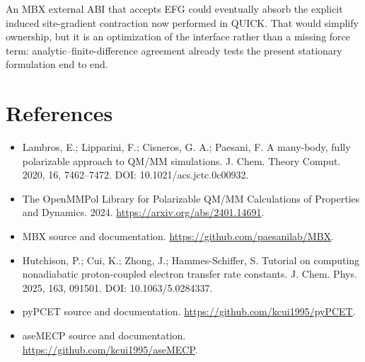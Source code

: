 \documentclass[11pt]{article}
\begin{document}
An MBX external ABI that accepts EFG could eventually absorb the explicit
induced site-gradient contraction now performed in QUICK. That would
simplify ownership, but it is an optimization of the interface rather than
a missing force term: analytic--finite-difference agreement already tests
the present stationary formulation end to end.

\section*{References}

\begin{itemize}
  \item Lambros, E.; Lipparini, F.; Cisneros, G. A.; Paesani, F. A
    many-body, fully polarizable approach to QM/MM simulations. J. Chem.
    Theory Comput. 2020, 16, 7462--7472.
    DOI: 10.1021/acs.jctc.0c00932.
  \item The OpenMMPol Library for Polarizable QM/MM Calculations of
    Properties and Dynamics. 2024. \url{https://arxiv.org/abs/2401.14691}.
  \item MBX source and documentation. \url{https://github.com/paesanilab/MBX}.
  \item Hutchison, P.; Cui, K.; Zhong, J.; Hammes-Schiffer, S.
    Tutorial on computing nonadiabatic proton-coupled electron transfer
    rate constants. J. Chem. Phys. 2025, 163, 091501.
    DOI: 10.1063/5.0284337.
  \item pyPCET source and documentation.
    \url{https://github.com/kcui1995/pyPCET}.
  \item aseMECP source and documentation.
    \url{https://github.com/kcui1995/aseMECP}.
\end{itemize}
\end{document}
